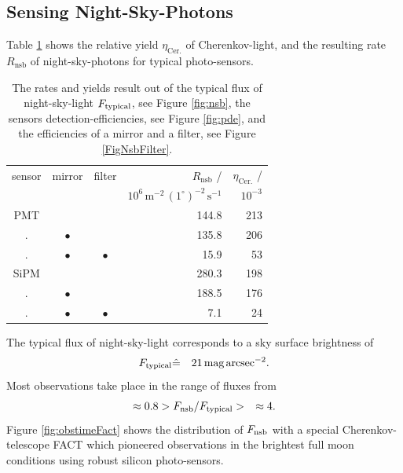 \documentclass{article}%
\begin{document}
\begin{multicols}{2}
\section*{Sensing Night-Sky-Photons}%
\label{sec:nsb}%
%
Table \ref{TabFilters} shows the relative yield $\eta_\text{Cer.}$ of Cherenkov-light, and the resulting rate $R_\text{nsb}$ of night-sky-photons for typical photo-sensors.
%
\begin{table}[H]
  \begin{center}
    \begin{tabular}{cccrr}
%
        \footnotesize{sensor} &
        \footnotesize{mirror} &
        \footnotesize{filter} &
        $R_\text{nsb}$ /   &
        $\eta_\text{Cer.}$ / \\
%
        &
        &
        &
        \footnotesize{$10^6\,\text{m}^{-2}\,(1^\circ)^{-2}\,\text{s}^{-1}$} &
        \footnotesize{$10^{-3}$} \\
%
        \hline
        PMT &             &             & 144.8 & 213\\
        .   & $\bullet{}$ &             & 135.8 & 206\\
        .   & $\bullet{}$ & $\bullet{}$ &  15.9 &  53\\
        \hline
        SiPM &             &             & 280.3 & 198\\
        .    & $\bullet{}$ &             & 188.5 & 176\\
        .    & $\bullet{}$ & $\bullet{}$ &   7.1 &  24\\
    \end{tabular}
    \caption{
The rates and yields result out of the typical flux of night-sky-light $F_\text{typical}{}$, see Figure \ref{fig:nsb}, the sensors detection-efficiencies, see Figure \ref{fig:pde}, and the efficiencies of a  mirror and a filter, see Figure \ref{FigNsbFilter}.
    }
    \label{TabFilters}
  \end{center}
\end{table}
%
The typical flux of night-sky-light corresponds to a sky surface brightness of
%
\begin{eqnarray*}
F_\text{typical}{} &\hat{=}& 21\,\text{mag}\,\text{arcsec}^{-2}.
\end{eqnarray*}
%
Most observations take place in the range of fluxes from
\begin{eqnarray*}
\approx{}0.8 &> F_\text{nsb}{} / F_\text{typical}{} >& \approx{}4.
\end{eqnarray*}
%
Figure \ref{fig:obstimeFact} shows the distribution of $F_\text{nsb}{}$ with a special Cherenkov-telescope FACT which pioneered observations in the brightest full moon conditions using robust silicon photo-sensors.

\end{multicols}
\end{document}
